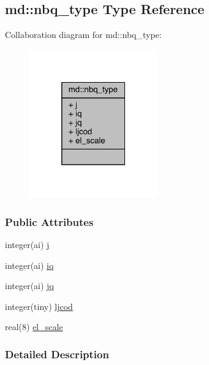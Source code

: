 \hypertarget{structmd_1_1nbq__type}{\subsection{md\-:\-:nbq\-\_\-type Type Reference}
\label{structmd_1_1nbq__type}
}


Collaboration diagram for md\-:\-:nbq\-\_\-type\-:
\nopagebreak
\begin{figure}[H]
\begin{center}
\leavevmode
\includegraphics[width=157pt]{structmd_1_1nbq__type__coll__graph}
\end{center}
\end{figure}
\subsubsection*{Public Attributes}
\begin{DoxyCompactItemize}
\item 
integer(ai) \hyperlink{structmd_1_1nbq__type_ae7410f8308449340827367663a3c4b98}{j}
\item 
integer(ai) \hyperlink{structmd_1_1nbq__type_a36c6111b2a1dce5444e430199d01b7ba}{iq}
\item 
integer(ai) \hyperlink{structmd_1_1nbq__type_a58457a2a9425c0d2af0987b689c374c5}{jq}
\item 
integer(tiny) \hyperlink{structmd_1_1nbq__type_a0415f50907dfda30fdd047736434ad16}{ljcod}
\item 
real(8) \hyperlink{structmd_1_1nbq__type_a761917eaa9155f98db23f85deb58dc05}{el\-\_\-scale}
\end{DoxyCompactItemize}


\subsubsection{Detailed Description}


